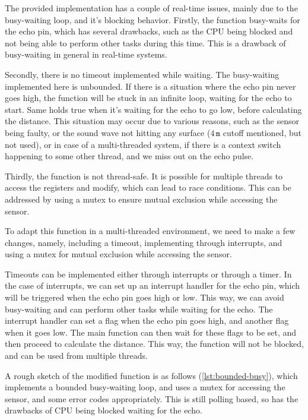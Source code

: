The provided implementation has a couple of real-time issues, mainly due to the busy-waiting loop, and it's blocking behavior.
Firstly, the function busy-waits for the echo pin, which has several drawbacks, such as the CPU being blocked and not being able to perform other tasks during this time.
This is a drawback of busy-waiting in general in real-time systems.

Secondly, there is no timeout implemented while waiting.
The busy-waiting implemented here is unbounded.
If there is a situation where the echo pin never goes high, the function will be stuck in an infinite loop, waiting for the echo to start.
Same holds true when it's waiting for the echo to go low, before calculating the distance.
This situation may occur due to various reasons, such as the sensor being faulty, or the sound wave not hitting any surface (\( 4 \, \texttt{m} \) cutoff mentioned, but not used), or in case of a multi-threaded system, if there is a context switch happening to some other thread, and we miss out on the echo pulse.

Thirdly, the function is not thread-safe.
It is possible for multiple threads to access the registers and modify, which can lead to race conditions.
This can be addressed by using a mutex to ensure mutual exclusion while accessing the sensor.

\vspace*{1em}
To adapt this function in a multi-threaded environment, we need to make a few changes, namely, including a timeout, implementing through interrupts, and using a mutex for mutual exclusion while accessing the sensor.

Timeouts can be implemented either through interrupts or through a timer.
In the case of interrupts, we can set up an interrupt handler for the echo pin, which will be triggered when the echo pin goes high or low.
This way, we can avoid busy-waiting and can perform other tasks while waiting for the echo.
The interrupt handler can set a flag when the echo pin goes high, and another flag when it goes low.
The main function can then wait for these flags to be set, and then proceed to calculate the distance.
This way, the function will not be blocked, and can be used from multiple threads.

\vspace*{1em}
A rough sketch of the modified function is as follows (\autoref{lst:bounded-busy}), which implements a bounded busy-waiting loop, and uses a mutex for accessing the sensor, and some error codes appropriately.
This is still polling based, so has the drawbacks of CPU being blocked waiting for the echo.


